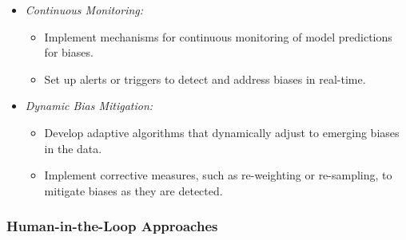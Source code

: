 \documentclass[12pt,a4paper,openright,twoside]{book}
\begin{document}
\begin{itemize}

    \item \emph{Continuous Monitoring:}

    \begin{itemize}

        \item Implement mechanisms for continuous monitoring of model predictions for biases.

        \item Set up alerts or triggers to detect and address biases in real-time.

    \end{itemize}
    
    \item \emph{Dynamic Bias Mitigation:}
    
    \begin{itemize}
    
        \item Develop adaptive algorithms that dynamically adjust to emerging biases in the data.
    
        \item Implement corrective measures, such as re-weighting or re-sampling, to mitigate biases as they are detected.
    
    \end{itemize}

\end{itemize}

\subsubsection{Human-in-the-Loop Approaches}
\end{document}
